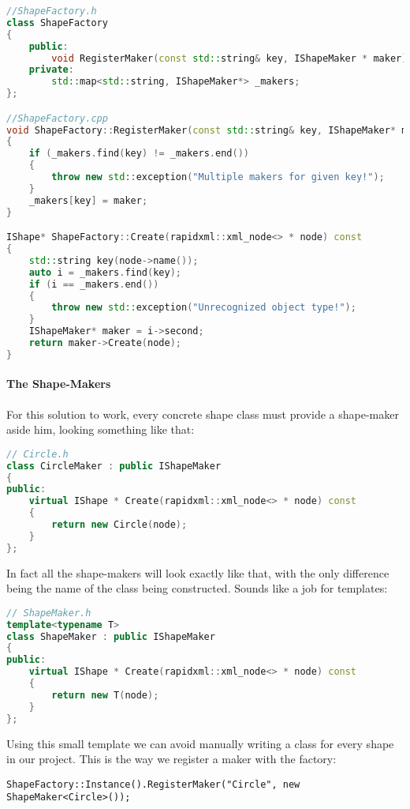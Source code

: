 \documentclass{book}
\begin{document}
\begin{lstlisting}[caption={Abstract Factory Pattern sample 2-3}, language=C++]
//ShapeFactory.h
class ShapeFactory
{
    public:
        void RegisterMaker(const std::string& key, IShapeMaker * maker);
    private:
        std::map<std::string, IShapeMaker*> _makers;
};

//ShapeFactory.cpp
void ShapeFactory::RegisterMaker(const std::string& key, IShapeMaker* maker)
{
    if (_makers.find(key) != _makers.end())
    {
        throw new std::exception("Multiple makers for given key!");
    }
    _makers[key] = maker;
}

IShape* ShapeFactory::Create(rapidxml::xml_node<> * node) const
{
    std::string key(node->name());
    auto i = _makers.find(key);
    if (i == _makers.end())
    {
        throw new std::exception("Unrecognized object type!");
    }
    IShapeMaker* maker = i->second;
    return maker->Create(node);
}
\end{lstlisting}
\paragraph{The Shape-Makers}

For this solution to work, every concrete shape class must provide a shape-maker aside him, looking something like that:

\begin{lstlisting}[caption={Abstract Factory Pattern sample 2-4}, language=C++]
// Circle.h
class CircleMaker : public IShapeMaker
{
public:
    virtual IShape * Create(rapidxml::xml_node<> * node) const
    {
        return new Circle(node);
    }
};
\end{lstlisting}
In fact all the shape-makers will look exactly like that, with the only difference being the name of the class being constructed. Sounds like a job for templates:

\begin{lstlisting}[caption={Abstract Factory Pattern sample 2-5}, language=C++]
// ShapeMaker.h
template<typename T>
class ShapeMaker : public IShapeMaker
{
public:
    virtual IShape * Create(rapidxml::xml_node<> * node) const
    {
        return new T(node);
    }
};
\end{lstlisting}

Using this small template we can avoid manually writing a class for every shape in our project.
This is the way we register a maker with the factory:
\begin{verbatim}
ShapeFactory::Instance().RegisterMaker("Circle", new ShapeMaker<Circle>());
\end{verbatim}
\end{document}
